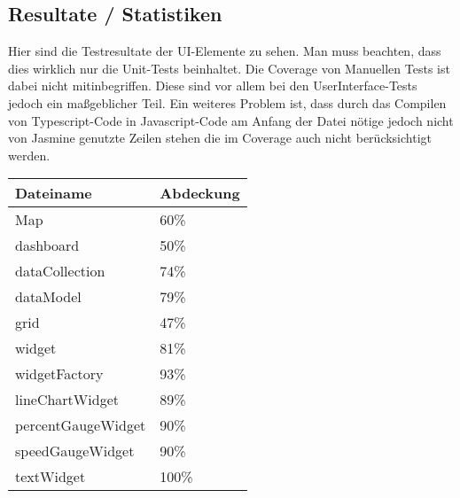 \documentclass[qualitaetssicherung.tex]{subfiles}
\begin{document}
\subsection*{Resultate / Statistiken}
	Hier sind die Testresultate der UI-Elemente zu sehen.
	Man muss beachten, dass dies wirklich nur die Unit-Tests beinhaltet. Die Coverage von Manuellen Tests ist dabei nicht mitinbegriffen. Diese sind vor allem bei den UserInterface-Tests jedoch ein maßgeblicher Teil.
	Ein weiteres Problem ist, dass durch das Compilen von Typescript-Code in Javascript-Code am Anfang der Datei nötige jedoch nicht von Jasmine genutzte Zeilen stehen die im Coverage auch nicht berücksichtigt werden.
	\begin{center}
		\begin{tabular}{| l | l |}
			\hline
			Dateiname & Abdeckung \\ \hline
			Map 			&  60\% \\ \hline
			dashboard 		&  50\% \\ \hline
			dataCollection 	&  74\% \\ \hline
			dataModel    	&  79\% \\ \hline
			grid		 	&  47\% \\ \hline
			widget		 	&  81\% \\ \hline
			widgetFactory 	&  93\% \\ \hline
			lineChartWidget &  89\% \\ \hline
			percentGaugeWidget 	&  90\% \\ \hline
			speedGaugeWidget 	&  90\% \\ \hline
			textWidget  	& 100\% \\ \hline
			\hline
		\end{tabular}
	\end{center}
	
\end{document}
